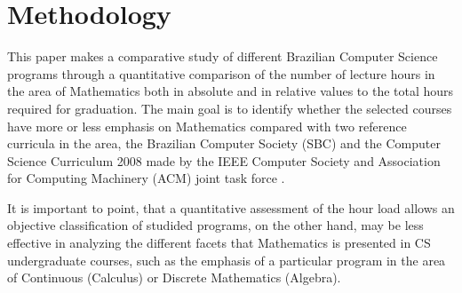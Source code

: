 \documentclass[conference]{IEEEtran}
\begin{document}
\section{Methodology}
	This paper makes a comparative study of different Brazilian Computer Science programs through a quantitative comparison of the number of lecture hours in the area of Mathematics both in absolute and in relative values to the total hours required for graduation. The main goal is to identify whether the selected courses have more or less emphasis on Mathematics compared with two reference curricula in the area, the Brazilian Computer Society (SBC) \cite{sbc:curriculo_2005} and the Computer Science Curriculum 2008 made by the IEEE Computer Society and Association for Computing Machinery (ACM) joint task force \cite{cs2008}.

	It is important to point, that a quantitative assessment of the hour load allows an objective classification of studided programs, on the other hand, may be less effective in analyzing the different facets that Mathematics is presented in CS undergraduate courses, such as the emphasis of a particular program in the area of Continuous (Calculus) or Discrete Mathematics (Algebra).


\end{document}
